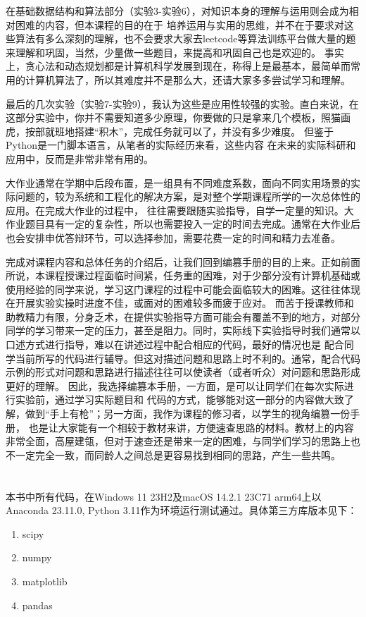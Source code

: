 \documentclass[UTF8,a5paper,10pt]{ctexbook}
\makeatletter
\renewcommand\tableofcontents{%
    \thispagestyle{empty}
    \section*{\contentsname
        \@mkboth{%
           \MakeUppercase\contentsname}{\MakeUppercase\contentsname}}%
    \@starttoc{toc}%
    \newpage
    }
\makeatother
\begin{document}
在基础数据结构和算法部分（实验3-实验6），对知识本身的理解与运用则会成为相对困难的内容，但本课程的目的在于
培养运用与实用的思维，并不在于要求对这些算法有多么深刻的理解，也不会要求大家去leetcode等算法训练平台做大量的题来理解和巩固，当然，少量做一些题目，来提高和巩固自己也是欢迎的。
事实上，贪心法和动态规划都是计算机科学发展到现在，称得上是最基本，最简单而常用的计算机算法了，所以其难度并不是那么大，还请大家多多尝试学习和理解。

最后的几次实验（实验7-实验9），我认为这些是应用性较强的实验。直白来说，在这部分实验中，你并不需要知道多少原理，你要做的只是拿来几个模板，照猫画虎，按部就班地搭建“积木”，完成任务就可以了，并没有多少难度。
但鉴于Python是一门脚本语言，从笔者的实际经历来看，这些内容
在未来的实际科研和应用中，反而是非常非常有用的。

大作业通常在学期中后段布置，是一组具有不同难度系数，面向不同实用场景的实际问题的，较为系统和工程化的解决方案，是对整个学期课程所学的一次总体性的应用。在完成大作业的过程中，
往往需要跟随实验指导，自学一定量的知识。大作业题目具有一定的复杂性，所以也需要投入一定的时间去完成。通常在大作业后也会安排申优答辩环节，可以选择参加，需要花费一定的时间和精力去准备。

完成对课程内容和总体任务的介绍后，让我们回到编篡手册的目的上来。正如前面所说，本课程授课过程面临时间紧，任务重的困难，对于少部分没有计算机基础或使用经验的同学来说，学习这门课程的过程中可能会面临较大的困难。这往往体现在开展实验实操时进度不佳，或面对的困难较多而疲于应对。
而苦于授课教师和助教精力有限，分身乏术，在提供实验指导方面可能会有覆盖不到的地方，对部分同学的学习带来一定的压力，甚至是阻力。同时，实际线下实验指导时我们通常以口述方式进行指导，难以在讲述过程中配合相应的代码，最好的情况也是
配合同学当前所写的代码进行辅导。但这对描述问题和思路上时不利的。通常，配合代码示例的形式对问题和思路进行描述往往可以使读者（或者听众）对问题和思路形成更好的理解。
因此，我选择编篡本手册，一方面，是可以让同学们在每次实际进行实验前，通过学习实际题目和
代码的方式，能够能对这一部分的内容做大致了解，做到“手上有枪”；另一方面，我作为课程的修习者，以学生的视角编篡一份手册，
也是让大家能有一个相较于教材来讲，方便速查思路的材料。教材上的内容非常全面，高屋建瓴，但对于速查还是带来一定的困难，与同学们学习的思路上也不一定完全一致，而同龄人之间总是更容易找到相同的思路，产生一些共鸣。
\newpage
\tableofcontents
\thispagestyle{empty}
本书中所有代码，在Windows 11 23H2及macOS 14.2.1 23C71 arm64上以Anaconda 23.11.0, Python 3.11作为环境运行测试通过。具体第三方库版本见下：
\begin{enumerate}
    \item scipy
    \item numpy
    \item matplotlib
    \item pandas
\end{enumerate}
\newpage
{}


\end{document}
